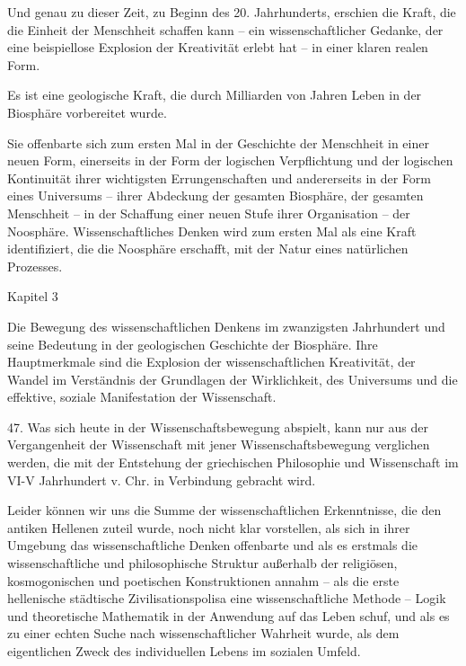 \documentclass[11pt,a4paper]{book}
\begin{document}
Und genau zu dieser Zeit, zu Beginn des 20. Jahrhunderts, erschien die Kraft, die die Einheit der Menschheit schaffen kann -- ein wissenschaftlicher Gedanke, der eine beispiellose Explosion der Kreativität erlebt hat -- in einer klaren realen Form. 

Es ist eine geologische Kraft, die durch Milliarden von Jahren Leben in der Biosphäre vorbereitet wurde. 

Sie offenbarte sich zum ersten Mal in der Geschichte der Menschheit in einer neuen Form, einerseits in der Form der logischen Verpflichtung und der logischen Kontinuität ihrer wichtigsten Errungenschaften und andererseits in der Form eines Universums -- ihrer Abdeckung der gesamten Biosphäre, der gesamten Menschheit -- in der Schaffung einer neuen Stufe ihrer Organisation -- der Noosphäre. Wissenschaftliches Denken wird zum ersten Mal als eine Kraft identifiziert, die die Noosphäre erschafft, mit der Natur eines natürlichen Prozesses. 

       Kapitel 3 



Die Bewegung des wissenschaftlichen Denkens im zwanzigsten Jahrhundert und seine Bedeutung in der geologischen Geschichte der Biosphäre. Ihre Hauptmerkmale sind die Explosion der wissenschaftlichen Kreativität, der Wandel im Verständnis der Grundlagen der Wirklichkeit, des Universums und die effektive, soziale Manifestation der Wissenschaft. 





47. Was sich heute in der Wissenschaftsbewegung abspielt, kann nur aus der Vergangenheit der Wissenschaft mit jener Wissenschaftsbewegung verglichen werden, die mit der Entstehung der griechischen Philosophie und Wissenschaft im VI-V Jahrhundert v. Chr. in Verbindung gebracht wird. 

Leider können wir uns die Summe der wissenschaftlichen Erkenntnisse, die den antiken Hellenen zuteil wurde, noch nicht klar vorstellen, als sich in ihrer Umgebung das wissenschaftliche Denken offenbarte und als es erstmals die wissenschaftliche und philosophische Struktur außerhalb der religiösen, kosmogonischen und poetischen Konstruktionen annahm -- als die erste hellenische städtische Zivilisationspolisa eine wissenschaftliche Methode -- Logik und theoretische Mathematik in der Anwendung auf das Leben schuf, und als es zu einer echten Suche nach wissenschaftlicher Wahrheit wurde, als dem eigentlichen Zweck des individuellen Lebens im sozialen Umfeld. 
\end{document}
